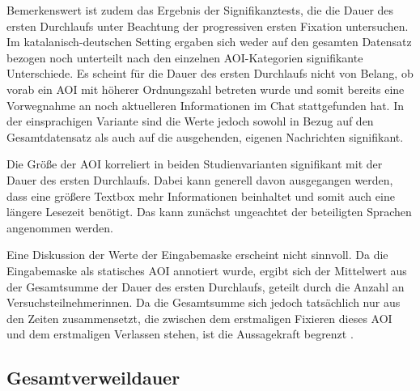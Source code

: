 Bemerkenswert ist zudem das Ergebnis der Signifikanztests, die die Dauer des ersten Durchlaufs unter Beachtung der progressiven ersten Fixation untersuchen. Im katalanisch-deutschen Setting ergaben sich weder auf den gesamten Datensatz bezogen noch unterteilt nach den einzelnen AOI-Kategorien signifikante Unterschiede. Es scheint für die Dauer des ersten Durchlaufs nicht von Belang, ob vorab ein AOI mit höherer Ordnungszahl betreten wurde und somit bereits eine Vorwegnahme an noch aktuelleren Informationen im Chat stattgefunden hat. In der einsprachigen Variante sind die Werte jedoch sowohl in Bezug auf den Gesamtdatensatz als auch auf die ausgehenden, eigenen Nachrichten signifikant.

Die Größe der AOI korreliert in beiden Studienvarianten signifikant mit der Dauer des ersten Durchlaufs. Dabei kann generell davon ausgegangen werden, dass eine größere Textbox mehr Informationen beinhaltet und somit auch eine längere Lesezeit benötigt. Das kann zunächst ungeachtet der beteiligten Sprachen angenommen werden.

Eine Diskussion der Werte der Eingabemaske erscheint nicht sinnvoll. Da die Eingabemaske als statisches AOI annotiert wurde, ergibt sich der Mittelwert aus der Gesamtsumme der Dauer des ersten Durchlaufs, geteilt durch die Anzahl an Versuchsteilnehmer{\textperiodcentered}innen. Da die Gesamtsumme sich jedoch tatsächlich nur aus den Zeiten zusammensetzt, die zwischen dem erstmaligen Fixieren dieses AOI und dem erstmaligen Verlassen stehen, ist die Aussagekraft begrenzt .


\subsection{Gesamtverweildauer}
\label{K7:subsec:dwelltime}



